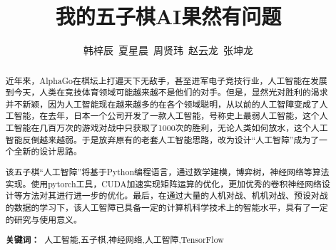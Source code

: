 \documentclass[a4paper]{article}
\title{\heiti \Large 我的五子棋AI果然有问题}%
\author{\songti \small 韩梓辰\ 夏星晨\ 周贤玮\ 赵云龙\ 张坤龙}%
\renewcommand{\headrulewidth}{0.4pt}
\begin{document}
\maketitle %
\thispagestyle{fancy} %
\lhead{\textcolor{gray} {计算机科学}}
\rhead{\textcolor{gray} {DOI:xxxxxx}}
\renewcommand{\headrulewidth}{0.4pt}
\begin{abstract}
    近年来，AlphaGo在棋坛上打遍天下无敌手，甚至进军电子竞技行业，人工智能在发展到今天，人类在竞技体育领域可能越来越不是他们的对手。但是，显然光对胜利的渴求并不新颖，因为人工智能现在越来越多的在各个领域聪明，从以前的人工智障变成了人工智能，在去年，日本一个公司开发了一款人工智能，号称史上最弱人工智能，这个人工智能在几百万次的游戏对战中只获取了1000次的胜利，无论人类如何放水，这个人工智能反倒越来越弱。于是放弃原有的老套人工智能思路，改为设计“人工智障”成为了一个全新的设计思路。\par
该五子棋“人工智障”将基于Python编程语言，通过数学建模，博弈树，神经网络等算法实现。使用pytorch工具，CUDA加速实现矩阵运算的优化，更加优秀的卷积神经网络设计等方法对其进行进一步的优化。最后，在通过大量的人机对战、机机对战、预设对战的数据的学习下，该人工智障已具备一定的计算机科学技术上的智能水平，具有了一定的研究与使用意义。
    \par\textbf{关键词：\ }人工智能,五子棋,神经网络,人工智障,TensorFlow
\end{abstract}
\setlength{\baselineskip}{20pt}
\tableofcontents  %
\newpage
\end{document}
